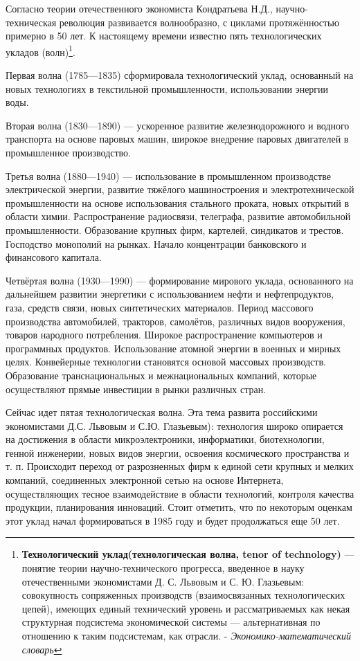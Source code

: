 \documentclass[a4paper,12pt]{article}
\begin{document}
Согласно теории отечественного экономиста Кондратьева Н.Д.\cite{Kondratiev},
научно-техническая революция развивается волнообразно, с циклами протяжённостью примерно в 50 лет. 
К настоящему времени известно пять технологических укладов (волн)\footnote{
\textbf{Технологический уклад(технологическая волна, tenor of technology)} — понятие теории
научно-технического прогресса, введенное в науку отечественными экономистами Д. С. Львовым и С. Ю. Глазьевым: совокупность 
сопряженных производств (взаимосвязанных технологических цепей), имеющих единый 
технический уровень и рассматриваемых как некая структурная подсистема 
экономической системы — альтернативная по отношению к таким подсистемам, 
как отрасли. - \textit{ Экономико-математический словарь\cite{Lopatnikov}} }.

Первая волна (1785—1835) сформировала технологический уклад, основанный на
новых технологиях в текстильной промышленности, использовании энергии воды.

Вторая волна (1830—1890) — ускоренное развитие железнодорожного и водного
транспорта на основе паровых машин, широкое внедрение паровых двигателей в
промышленное производство.

Третья волна (1880—1940) — использование в промышленном производстве
электрической энергии, развитие тяжёлого машиностроения и электротехнической
промышленности на основе использования стального проката, новых открытий в
области химии. Распространение радиосвязи, телеграфа, развитие автомобильной
промышленности. Образование крупных фирм, картелей, синдикатов и трестов.
Господство монополий на рынках. Начало концентрации банковского и финансового
капитала.

Четвёртая волна (1930—1990) — формирование мирового уклада, основанного на
дальнейшем развитии энергетики с использованием нефти и нефтепродуктов, газа,
средств связи, новых синтетических материалов. Период массового производства
автомобилей, тракторов, самолётов, различных видов вооружения, товаров
народного потребления. Широкое распространение компьютеров и программных
продуктов. Использование атомной энергии в военных и мирных целях. Конвейерные
технологии становятся основой массовых производств. Образование 
транснациональных и межнациональных компаний, которые осуществляют прямые
инвестиции в рынки различных стран.

Сейчас идет пятая технологическая волна. Эта тема развита 
российскими экономистами Д.С. Львовым\cite{Lvov} и С.Ю.
Глазьевым\cite{Glaziev}): технология широко опирается на достижения в
области микроэлектроники, информатики, биотехнологии, генной инженерии, новых видов энергии, освоения космического пространства и т. п.
Происходит переход от разрозненных фирм к единой сети крупных и мелких компаний, 
соединенных электронной сетью на основе Интернета, осуществляющих тесное взаимодействие 
в области технологий, контроля качества продукции, планирования инноваций. Стоит
отметить, что по некоторым оценкам этот уклад начал формироваться в 1985 году и
будет продолжаться еще 50 лет.
\end{document}
